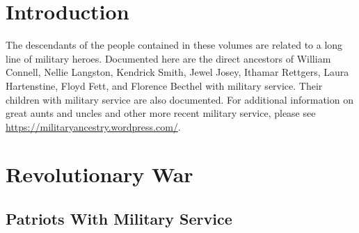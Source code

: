 \documentclass[11pt,letter]{book}
\begin{document}
\tableofcontents
\mainmatter
\chapter{Introduction}

The descendants of the people contained in these volumes are related to a long line of military heroes.  Documented here are the direct ancestors of William Connell, Nellie Langston, Kendrick Smith, Jewel Josey, Ithamar Rettgers, Laura Hartenstine, Floyd Fett, and Florence Becthel with military service.  Their children with military service are also documented.  For additional information on great aunts and uncles and other more recent military service, please see \url{https://militaryancestry.wordpress.com/}.

\chapter{Revolutionary War}

\section{Patriots With Military Service}
\end{document}
